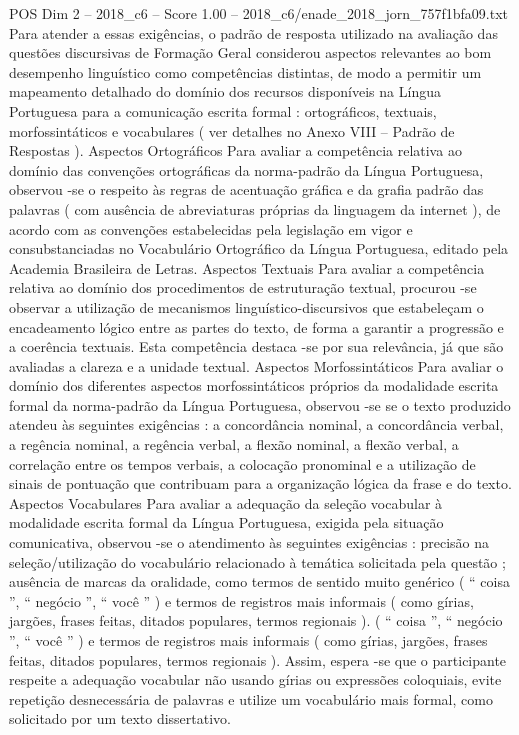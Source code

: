 \begin{textsample}{POS Dim 2 – 2018\_c6 – Score 1.00 – 2018\_c6/enade\_2018\_jorn\_757f1bfa09.txt}
Para atender a essas exigências, o padrão de resposta utilizado na avaliação das questões discursivas de Formação Geral considerou aspectos relevantes ao bom desempenho linguístico como competências distintas, de modo a permitir um mapeamento detalhado do domínio dos recursos disponíveis na Língua Portuguesa para a comunicação escrita formal : ortográficos, textuais, morfossintáticos e vocabulares ( ver detalhes no Anexo VIII – Padrão de Respostas ).
Aspectos Ortográficos Para avaliar a competência relativa ao domínio das convenções ortográficas da norma-padrão da Língua Portuguesa, observou -se o respeito às regras de acentuação gráfica e da grafia padrão das palavras ( com ausência de abreviaturas próprias da linguagem da internet ), de acordo com as convenções estabelecidas pela legislação em vigor e consubstanciadas no Vocabulário Ortográfico da Língua Portuguesa, editado pela Academia Brasileira de Letras.
Aspectos Textuais Para avaliar a competência relativa ao domínio dos procedimentos de estruturação textual, procurou -se observar a utilização de mecanismos linguístico-discursivos que estabeleçam o encadeamento lógico entre as partes do texto, de forma a garantir a progressão e a coerência textuais.
Esta competência destaca -se por sua relevância, já que são avaliadas a clareza e a unidade textual.
Aspectos Morfossintáticos Para avaliar o domínio dos diferentes aspectos morfossintáticos próprios da modalidade escrita formal da norma-padrão da Língua Portuguesa, observou -se se o texto produzido atendeu às seguintes exigências : a concordância nominal, a concordância verbal, a regência nominal, a regência verbal, a flexão nominal, a flexão verbal, a correlação entre os tempos verbais, a colocação pronominal e a utilização de sinais de pontuação que contribuam para a organização lógica da frase e do texto.
Aspectos Vocabulares Para avaliar a adequação da seleção vocabular à modalidade escrita formal da Língua Portuguesa, exigida pela situação comunicativa, observou -se o atendimento às seguintes exigências : precisão na seleção/utilização do vocabulário relacionado à temática solicitada pela questão ; ausência de marcas da oralidade, como termos de sentido muito genérico ( “ coisa ”, “ negócio ”, “ você ” ) e termos de registros mais informais ( como gírias, jargões, frases feitas, ditados populares, termos regionais ). ( “ coisa ”, “ negócio ”, “ você ” ) e termos de registros mais informais ( como gírias, jargões, frases feitas, ditados populares, termos regionais ).
Assim, espera -se que o participante respeite a adequação vocabular não usando gírias ou expressões coloquiais, evite repetição desnecessária de palavras e utilize um vocabulário mais formal, como solicitado por um texto dissertativo.

\end{textsample}
